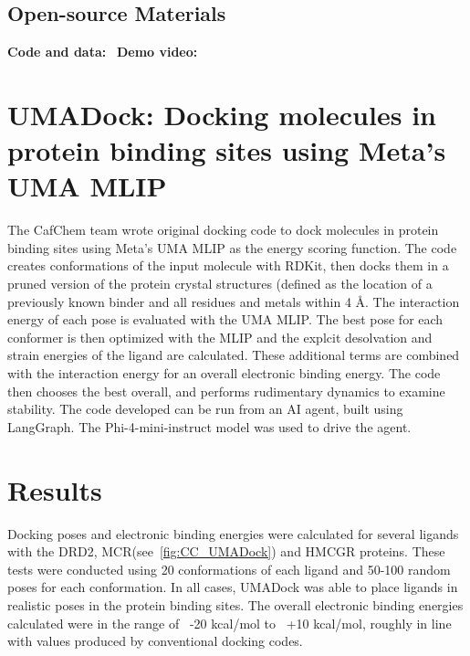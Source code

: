 \subsection*{Open-source Materials}
\textbf{Code and data:} \, \textbf{Demo video:} 





\section{UMADock: Docking molecules in protein binding sites using Meta's UMA MLIP}
The CafChem team wrote original docking code to dock molecules in protein binding sites using Meta's UMA MLIP as the energy scoring function. The code creates conformations of the input molecule with RDKit, then docks them in a pruned version of the protein crystal structures (defined as the location of a previously known binder and all residues and metals within 4 \AA. The interaction energy of each pose is evaluated with the UMA MLIP. The best pose for each conformer is then optimized with the MLIP and the explcit desolvation and strain energies of the ligand are calculated. These additional terms are combined with the interaction energy for an overall electronic binding energy. The code then chooses the best overall, and performs rudimentary dynamics to examine stability. The code developed can be run from an AI agent, built using LangGraph. The Phi-4-mini-instruct model was used to drive the agent. 

\section*{Results}
Docking poses and electronic binding energies were calculated for several ligands with the DRD2, MCR(see~\ref{fig:CC_UMADock}) and HMCGR proteins. These tests were conducted using 20 conformations of each ligand and 50-100 random poses for each conformation.  In all cases, UMADock was able to place ligands in realistic poses in the protein binding sites. The overall electronic binding energies calculated were in the range of ~-20 kcal/mol to ~+10 kcal/mol, roughly in line with values produced by conventional docking codes. 

